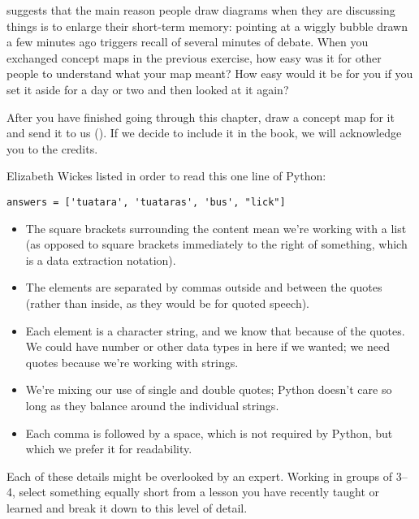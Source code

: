 
\cite{Cher2007} suggests that
the main reason people draw diagrams when they are discussing things
is to enlarge their short-term memory:
pointing at a wiggly bubble drawn a few minutes ago triggers recall of several minutes of debate.
When you exchanged concept maps in the previous exercise,
how easy was it for other people to understand what your map meant?
How easy would it be for you if you set it aside for a day or two and then looked at it again?


After you have finished going through this chapter,
draw a concept map for it and send it to us ().
If we decide to include it in the book,
we will acknowledge you to the credits.


Elizabeth Wickes listed
in order to read this one line of Python:

\begin{verbatim}
answers = ['tuatara', 'tuataras', 'bus', "lick"]
\end{verbatim}

\begin{itemize}
\item
  The square brackets surrounding the content mean we're working with a list
  (as opposed to square brackets immediately to the right of something,
  which is a data extraction notation).
\item
  The elements are separated by commas outside and between the quotes
  (rather than inside, as they would be for quoted speech).
\item
  Each element is a character string,
  and we know that because of the quotes.
  We could have number or other data types in here if we wanted;
  we need quotes because we're working with strings.
\item
  We're mixing our use of single and double quotes;
  Python doesn't care so long as they balance around the individual strings.
\item
  Each comma is followed by a space,
  which is not required by Python,
  but which we prefer it for readability.
\end{itemize}

Each of these details might be overlooked by an expert.
Working in groups of 3--4,
select something equally short from a lesson you have recently taught or learned
and break it down to this level of detail.
